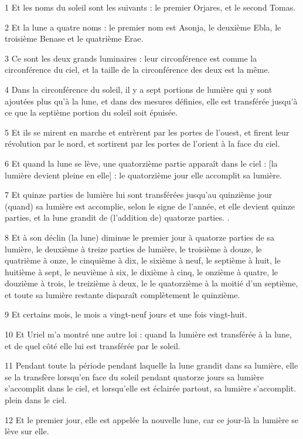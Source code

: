 \par 1 Et les noms du soleil sont les suivants : le premier Orjares, et le second Tomas.
\par 2 Et la lune a quatre noms : le premier nom est Asonja, le deuxième Ebla, le troisième Benase et le quatrième Erae.
\par 3 Ce sont les deux grands luminaires : leur circonférence est comme la circonférence du ciel, et la taille de la circonférence des deux est la même.
\par 4 Dans la circonférence du soleil, il y a sept portions de lumière qui y sont ajoutées plus qu'à la lune, et dans des mesures définies, elle est transférée jusqu'à ce que la septième portion du soleil soit épuisée.
\par 5 Et ils se mirent en marche et entrèrent par les portes de l'ouest, et firent leur révolution par le nord, et sortirent par les portes de l'orient à la face du ciel.
\par 6 Et quand la lune se lève, une quatorzième partie apparaît dans le ciel : [la lumière devient pleine en elle] : le quatorzième jour elle accomplit sa lumière.
\par 7 Et quinze parties de lumière lui sont transférées jusqu'au quinzième jour (quand) sa lumière est accomplie, selon le signe de l'année, et elle devient quinze parties, et la lune grandit de (l'addition de) quatorze parties. .
\par 8 Et à son déclin (la lune) diminue le premier jour à quatorze parties de sa lumière, le deuxième à treize parties de lumière, le troisième à douze, le quatrième à onze, le cinquième à dix, le sixième à neuf, le septième à huit, le huitième à sept, le neuvième à six, le dixième à cinq, le onzième à quatre, le douzième à trois, le treizième à deux, le le quatorzième à la moitié d'un septième, et toute sa lumière restante disparaît complètement le quinzième.
\par 9 Et certains mois, le mois a vingt-neuf jours et une fois vingt-huit.
\par 10 Et Uriel m'a montré une autre loi : quand la lumière est transférée à la lune, et de quel côté elle lui est transférée par le soleil.
\par 11 Pendant toute la période pendant laquelle la lune grandit dans sa lumière, elle se la transfère lorsqu'en face du soleil pendant quatorze jours sa lumière s'accomplit dans le ciel, et lorsqu'elle est éclairée partout, sa lumière s'accomplit. plein dans le ciel.
\par 12 Et le premier jour, elle est appelée la nouvelle lune, car ce jour-là la lumière se lève sur elle.
